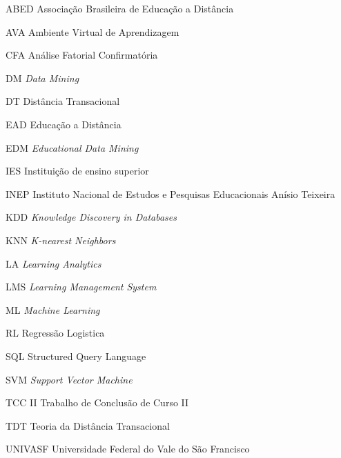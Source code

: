 \begin{siglas}
  \item[ABED] Associação Brasileira de Educação a Distância
  \item[AVA] Ambiente Virtual de Aprendizagem
  \item[CFA] Análise Fatorial Confirmatória
  \item[DM] \textit{Data Mining}
  \item[DT] Distância Transacional
  \item[EAD] Educação a Distância
  \item[EDM] \textit{Educational Data Mining}
  \item[IES] Instituição de ensino superior
  \item[INEP] Instituto Nacional de Estudos e Pesquisas Educacionais Anísio Teixeira
  \item[KDD] \textit{Knowledge Discovery in Databases}
  \item[KNN] \textit{K-nearest Neighbors}
  \item[LA] \textit{Learning Analytics}
  \item[LMS] \textit{Learning Management System}
  \item[ML] \textit{Machine Learning}
  \item[RL] Regressão Logistica
  \item[SQL] Structured Query Language
  \item[SVM] \textit{Support Vector Machine}
  \item[TCC II] Trabalho de Conclusão de Curso II
  \item[TDT] Teoria da Distância Transacional
  \item[UNIVASF] Universidade Federal do Vale do São Francisco
\end{siglas}

\tableofcontents*
\cleardoublepage
